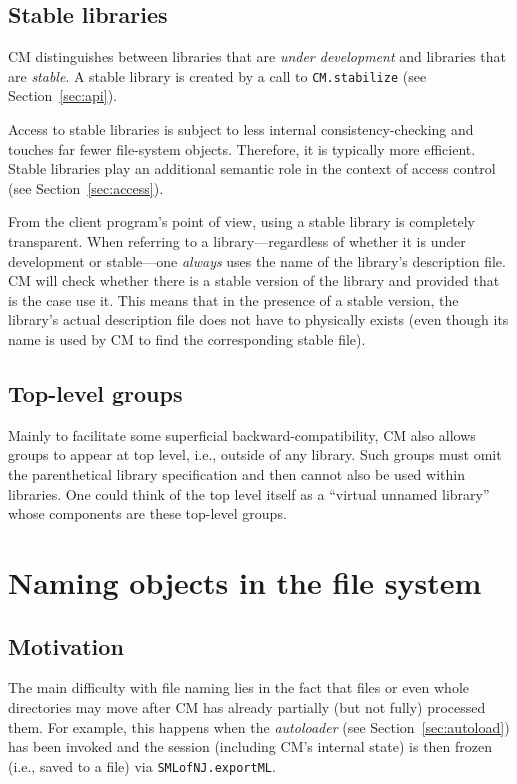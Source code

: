 \documentclass[titlepage,letterpaper]{article}
\begin{document}
\subsection{Stable libraries}
\label{sec:stable}

CM distinguishes between libraries that are {\em under development}
and libraries that are {\em stable}.  A stable library is created by a
call to {\tt CM.stabilize} (see Section~\ref{sec:api}).

Access to stable libraries is subject to less internal
consistency-checking and touches far fewer file-system
objects. Therefore, it is typically more efficient.  Stable libraries
play an additional semantic role in the context of access control (see
Section~\ref{sec:access}).

From the client program's point of view, using a stable library is
completely transparent.  When referring to a library---regardless of
whether it is under development or stable---one {\em always} uses the
name of the library's description file.  CM will check whether there
is a stable version of the library and provided that is the case use
it.  This means that in the presence of a stable version, the
library's actual description file does not have to physically exists
(even though its name is used by CM to find the corresponding stable
file).

\subsection{Top-level groups}

Mainly to facilitate some superficial backward-compatibility, CM also
allows groups to appear at top level, i.e., outside of any library.
Such groups must omit the parenthetical library specification and then
cannot also be used within libraries. One could think of the top level
itself as a ``virtual unnamed library'' whose components are these
top-level groups.

\section{Naming objects in the file system}

\subsection{Motivation}

The main difficulty with file naming lies in the fact that files or
even whole directories may move after CM has already partially (but
not fully) processed them.  For example, this happens when the {\em
autoloader} (see Section~\ref{sec:autoload}) has been invoked and the
session (including CM's internal state) is then frozen (i.e., saved to
a file) via {\tt SMLofNJ.exportML}.
\end{document}
